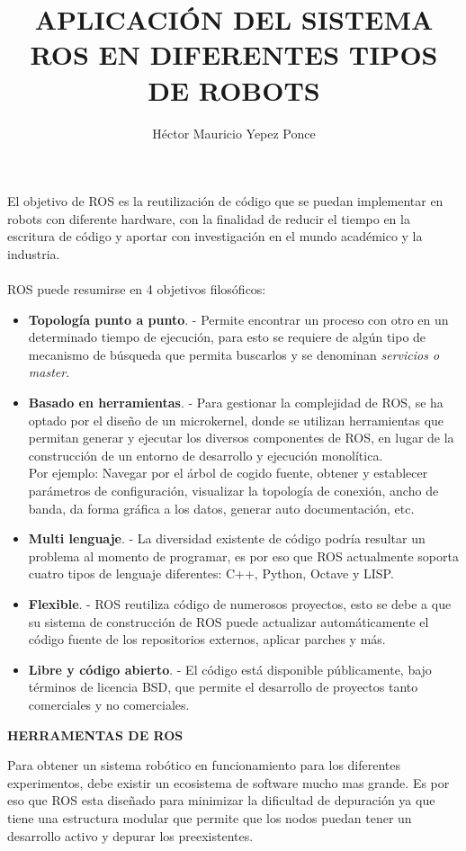 \documentclass[12pt,a4paper]{article}
\title{APLICACIÓN DEL SISTEMA ROS EN DIFERENTES TIPOS DE ROBOTS}
\author{Héctor Mauricio Yepez Ponce}
\begin{document}
\maketitle

El objetivo de ROS es la reutilización de código que se puedan implementar en robots con diferente hardware, con la finalidad de reducir el tiempo en la escritura de código y aportar con investigación en el mundo académico y la industria. 
\\\\
ROS puede resumirse en 4 objetivos filosóficos:
\begin{itemize}
\item \textbf{Topología punto a punto}. - Permite encontrar un proceso con otro en un determinado tiempo de ejecución, para esto se requiere de algún tipo de mecanismo de búsqueda que permita buscarlos y se denominan \textit{servicios o master}.
\item \textbf{Basado en herramientas}. - Para gestionar la complejidad de ROS, se ha optado por el diseño de un microkernel, donde se utilizan herramientas que permitan generar y ejecutar los diversos componentes de ROS, en lugar de la construcción de un entorno de desarrollo y ejecución monolítica.
\\
Por ejemplo: Navegar por el árbol de cogido fuente, obtener y establecer parámetros de configuración, visualizar la topología de conexión, ancho de banda, da forma gráfica a los datos, generar auto documentación, etc. 
\item \textbf{Multi lenguaje}. - La diversidad existente de código podría resultar un problema al momento de programar, es por eso que ROS actualmente soporta cuatro tipos de lenguaje diferentes: C++, Python, Octave y LISP.
\item \textbf{Flexible}. - ROS reutiliza código de numerosos proyectos, esto se debe a que su sistema de construcción de ROS puede actualizar automáticamente el código fuente de los repositorios externos, aplicar parches y más. 
\item \textbf{Libre y código abierto}. - El código está disponible públicamente, bajo términos de licencia BSD, que permite el desarrollo de proyectos tanto comerciales y no comerciales.
\end{itemize}
\begin{center}
\textbf{HERRAMENTAS DE ROS}
\end{center}
Para obtener un sistema robótico en funcionamiento para los diferentes experimentos, debe existir un ecosistema de software mucho mas grande. Es por eso que ROS esta diseñado para minimizar la dificultad de depuración ya que tiene una estructura modular que permite que los nodos puedan tener un desarrollo activo y depurar los preexistentes.
\end{document}
